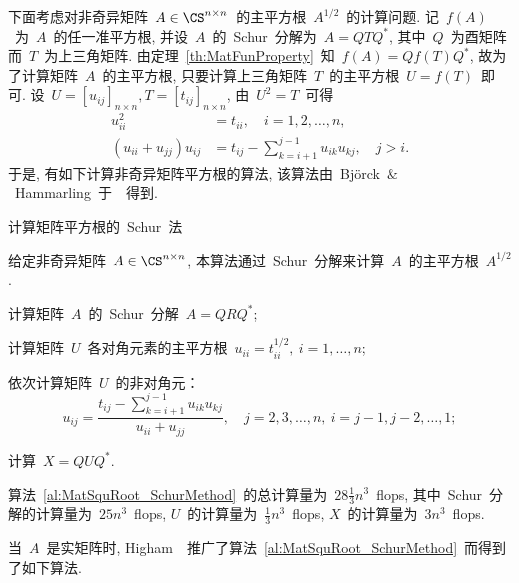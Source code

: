 下面考虑对非奇异矩阵~$A\in\CS^{n\times
n}$~的主平方根~$A^{1/2}$~的计算问题.
记~$f(A)$~为~$A$~的任一准平方根, 并设~$A$~的~Schur~分解为~$A=QTQ^*$,
其中~$Q$~为酉矩阵而~$T$~为上三角矩阵.
由定理~\ref{th:MatFunProperty}~知~$f(A)=Qf(T)Q^*$,
故为了计算矩阵~$A$~的主平方根, 只要计算上三角矩阵~$T$~的主平方根~$U
= f(T)$~即可. 设~$U=[u_{ij}]_{n\times n}, T=[t_{ij}]_{n\times n}$,
由~$U^2 = T$~可得
\begin{align*}
u_{ii}^2 & = t_{ii},\quad i = 1,2,\ldots,n,\\
(u_{ii}+u_{jj})u_{ij} & = t_{ij} - \sum_{k=i+1}^{j-1}u_{ik}u_{kj},
\quad j > i.
\end{align*}
于是, 有如下计算非奇异矩阵平方根的算法,
该算法由~Bj\"{o}rck~$\&$~Hammarling~于~\cite{Bjorck1983}~得到.

\begin{algorithm}[h!]
\caption{计算矩阵平方根的~Schur~法~\cite{Bjorck1983}}
\label{al:MatSquRoot_SchurMethod} 给定非奇异矩阵~$A\in\CS^{n\times
n}$, 本算法通过~Schur~分解来计算~$A$~的主平方根~$A^{1/2}$.
\begin{list}{.}{
\setlength{\rightmargin}{0em}\setlength{\leftmargin}{1.2em}}
\item
计算矩阵~$A$~的~Schur~分解~$A = QRQ^*$;
\item
计算矩阵~$U$~各对角元素的主平方根~$u_{ii} = t_{ii}^{1/2},\ i = 1,
\ldots, n$;
\item
依次计算矩阵~$U$~的非对角元：
$$
u_{ij} = \displaystyle
\frac{t_{ij}-\displaystyle\sum_{k=i+1}^{j-1}u_{ik}u_{kj}}{u_{ii}+u_{jj}},
\quad j = 2,3,\ldots,n,\ i = j-1,j-2,\ldots,1;
$$
\item
计算~$X = QUQ^*$.
\end{list}
\end{algorithm}

算法~\ref{al:MatSquRoot_SchurMethod}~的总计算量为~$28\frac{1}{3}n^3$~flops,
其中~Schur~分解的计算量为~$25n^3$~flops,
$U$~的计算量为~$\frac{1}{3}n^3$~flops, $X$~的计算量为~$3n^3$~flops.

当~$A$~是实矩阵时,
Higham~\cite{Higham1987}~推广了算法~\ref{al:MatSquRoot_SchurMethod}~而得到了如下算法.

